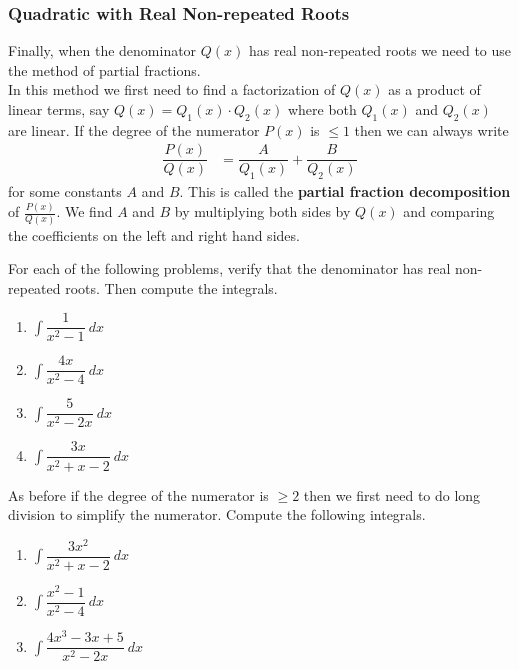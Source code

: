 \subsubsection*{Quadratic with Real Non-repeated Roots}
Finally, when the denominator $Q(x)$ has real non-repeated roots we need to use the method of partial fractions.\\


In this method we first need to find a factorization of $Q(x)$ as a product of linear terms, say $Q(x) = Q_1(x) \cdot Q_2(x)$ where both $Q_1(x)$ and $Q_2(x)$ are linear. If the degree of the numerator $P(x)$ is $\le 1$ then we can always write
\begin{align*}
	\dfrac{P(x)}{Q(x)}
	 & =
	\dfrac{A}{Q_1(x)} + \dfrac{B}{Q_2(x)}
\end{align*}
for some constants $A$ and $B$.
This is called the {\bf partial fraction decomposition} of $\frac{P(x)}{Q(x)}$. We find $A$ and $B$ by multiplying both sides by $Q(x)$ and comparing the coefficients on the left and right hand sides.


\begin{exercise}
	For each of the following problems, verify that the denominator has real non-repeated roots. Then
	compute the integrals.
	\begin{multicols}{2}
		\begin{enumerate}
			\item $ \int \dfrac{1}{x^2 - 1} \: dx$
			\item $ \int \dfrac{4x}{x^2 - 4} \: dx$
			\item $ \int \dfrac{5}{x^2 - 2x} \: dx$
			\item $ \int \dfrac{3 x}{x^2 + x - 2} \: dx$
		\end{enumerate}
	\end{multicols}
\end{exercise}

\begin{exercise}As before if the degree of the numerator is $ \ge 2$ then we first need to do long division to simplify the numerator. Compute the following integrals.
	\begin{multicols}{2}
		\begin{enumerate}
			\item $ \int \dfrac{3 x^2}{x^2 + x - 2} \: dx$
			\item $ \int \dfrac{x^2 - 1}{x^2 - 4} \: dx$
			\item $ \int \dfrac{4x^3 - 3x + 5}{x^2 - 2x} \: dx$
		\end{enumerate}
	\end{multicols}
\end{exercise}


